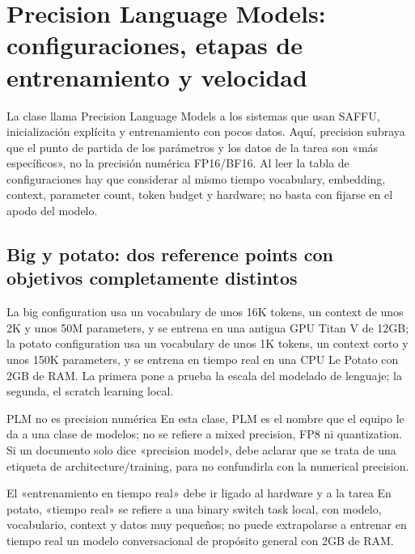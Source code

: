 \section{Precision Language Models: configuraciones, etapas de entrenamiento y velocidad}

La clase llama Precision Language Models a los sistemas que usan SAFFU, inicialización explícita y entrenamiento con pocos datos. Aquí, precision subraya que el punto de partida de los parámetros y los datos de la tarea son «más específicos», no la precisión numérica FP16/BF16. Al leer la tabla de configuraciones hay que considerar al mismo tiempo vocabulary, embedding, context, parameter count, token budget y hardware; no basta con fijarse en el apodo del modelo.

\subsection{Big y potato: dos reference points con objetivos completamente distintos}

La big configuration usa un vocabulary de unos 16K tokens, un context de unos 2K y unos 50M parameters, y se entrena en una antigua GPU Titan V de 12GB; la potato configuration usa un vocabulary de unos 1K tokens, un context corto y unos 150K parameters, y se entrena en tiempo real en una CPU Le Potato con 2GB de RAM. La primera pone a prueba la escala del modelado de lenguaje; la segunda, el scratch learning local.


\begin{knowledgebox}{PLM no es precision numérica}
En esta clase, PLM es el nombre que el equipo le da a una clase de modelos; no se refiere a mixed precision, FP8 ni quantization. Si un documento solo dice «precision model», debe aclarar que se trata de una etiqueta de architecture/training, para no confundirla con la numerical precision.
\end{knowledgebox}

\begin{warningbox}{El «entrenamiento en tiempo real» debe ir ligado al hardware y a la tarea}
En potato, «tiempo real» se refiere a una binary switch task local, con modelo, vocabulario, context y datos muy pequeños; no puede extrapolarse a entrenar en tiempo real un modelo conversacional de propósito general con 2GB de RAM.
\end{warningbox}

